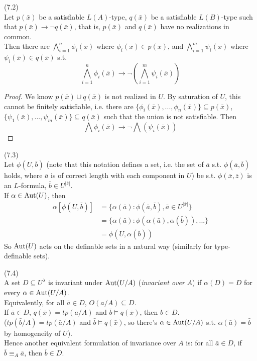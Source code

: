 \documentclass[a4paper]{article}
\begin{document}
\begin{fact} (7.2)\\
    Let $p(\bar{x})$ be a satisfiable $L(A)$-type, $q(\bar{x})$ be a satisfiable $L(B)$-type such that $p(\bar{x}) \to \neg q(\bar{x})$, that is, $p(\bar{x})$ and $q(\bar{x})$ have no realizations in common.\\
    Then there are $\bigwedge_{i=1}^n \phi_i(\bar{x})$ where $\phi_i(\bar{x}) \in p(\bar{x})$, and $\bigwedge_{i=1}^m \psi_i(\bar{x})$ where $\psi_i(\bar{x}) \in q(\bar{x})$ s.t.
    $$\bigwedge_{i=1}^n \phi_i(\bar{x}) \to \neg (\bigwedge_{i=1}^m \psi_i(\bar{x}))$$
    \begin{proof}
        We know $p(\bar{x}) \cup q(\bar{x})$ is not realized in $U$. By saturation of $U$, this cannot be finitely satisfiable, i.e. there are $\{\phi_i(\bar{x}),...,\phi_n(\bar{x})\} \subseteq p(\bar{x})$, $\{\psi_1(\bar{x}),...,\psi_m(\bar{x})\} \subseteq q(\bar{x})$ such that the union is not satisfiable. Then 
        $$\bigwedge \phi_i(\bar{x}) \to \neg \bigwedge (\psi_i(\bar{x}))$$
    \end{proof}
\end{fact}

\begin{rem} (7.3)\\
    Let $\phi(U,\bar{b})$ (note that this notation defines a set, i.e. the set of $\bar{a}$ s.t. $\phi(\bar{a},\bar{b})$ holds, where $\bar{a}$ is of correct length with each component in $U$) be s.t. $\phi(\bar{x},\bar{z})$ is an $L$-formula, $\bar{b} \in U^{|\bar{z}|}$.\\
    If $\alpha \in \operatorname{Aut}(U)$, then
    \begin{equation*}
        \begin{aligned}
            \alpha[\phi(U,\bar{b})] &= \{\alpha(\bar{a}): \phi(\bar{a},\bar{b}),\bar{a} \in U^{|\bar{x}|}\}\\
            &= \{\alpha(\bar{a}):\phi(\alpha(\bar{a}),\alpha(\bar{b})),...\}\\
            &= \phi(U,\alpha(\bar{b}))
        \end{aligned}
    \end{equation*}
    So $\operatorname{Aut}(U)$ acts on the definable sets in a natural way (similarly for type-definable sets).
\end{rem}

\begin{defi} (7.4)\\
    A set $D \subseteq U^\lambda$ is invariant under $\operatorname{Aut}(U/A)$ (\emph{invariant over} $A$) if $\alpha(D) = D$ for every $\alpha \in \operatorname{Aut}(U/A)$.\\
    Equivalently, for all $\bar{a} \in D$, $O(a/A) \subseteq D$.\\
    If $\bar{a} \in D$, $q(\bar{x}) = tp(a/A)$ and $\bar{b} \vDash q(\bar{x})$, then $b \in D$.\\
    ($tp(\bar{b}/A) = tp(\bar{a}/A)$ and $\bar{b} \vDash q(\bar{x})$, so there's $\alpha \in \operatorname{Aut}(U/A)$ s.t. $\alpha(\bar{a}) = \bar{b}$ by homogeneity of $U$).\\
    Hence another equivalent formulation of invariance over $A$ is: for all $\bar{a} \in D$, if $\bar{b} \equiv_A \bar{a}$, then $\bar{b} \in D$.
\end{defi}
\end{document}
